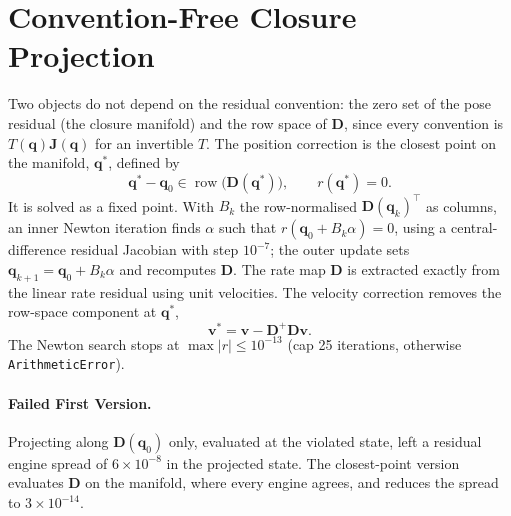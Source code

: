 \documentclass[11pt,a4paper]{article}
\newcommand{\bD}{\mathbf{D}}
\newcommand{\bJ}{\mathbf{J}}
\newcommand{\bq}{\mathbf{q}}
\newcommand{\bv}{\mathbf{v}}
\newcommand{\row}{\operatorname{row}}
\begin{document}
\section{Convention-Free Closure Projection}
Two objects do not depend on the residual convention: the zero set of the pose
residual (the closure manifold) and the row space of $\bD$, since every
convention is $T(\bq)\bJ(\bq)$ for an invertible $T$.  The position correction
is the closest point on the manifold, $\bq^{*}$, defined by
\begin{equation}
\bq^{*}-\bq_0\in\row\bigl(\bD(\bq^{*})\bigr),\qquad r(\bq^{*})=0 .
\end{equation}
It is solved as a fixed point.  With $B_k$ the row-normalised $\bD(\bq_k)^{\top}$
as columns, an inner Newton iteration finds $\alpha$ such that
$r(\bq_0+B_k\alpha)=0$, using a central-difference residual Jacobian with step
$10^{-7}$; the outer update sets $\bq_{k+1}=\bq_0+B_k\alpha$ and recomputes
$\bD$.  The rate map $\bD$ is extracted exactly from the linear rate residual
using unit velocities.  The velocity correction removes the row-space
component at $\bq^{*}$,
\begin{equation}
\bv^{*}=\bv-\bD^{+}\bD\bv .
\end{equation}
The Newton search stops at $\max|r|\le10^{-13}$ (cap 25 iterations, otherwise
\texttt{ArithmeticError}).

\paragraph{Failed First Version.}  Projecting along $\bD(\bq_0)$ only, evaluated
at the violated state, left a residual engine spread of $6\times10^{-8}$ in the
projected state.  The closest-point version evaluates $\bD$ on the manifold,
where every engine agrees, and reduces the spread to $3\times10^{-14}$.
\end{document}
